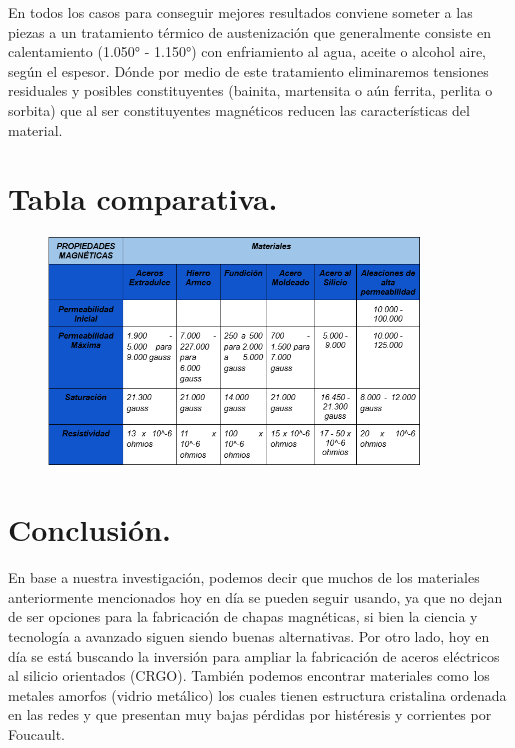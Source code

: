 \documentclass[12pt,a4paper]{article}
\begin{document}
En todos los casos para conseguir mejores resultados conviene someter a las piezas a un tratamiento térmico de austenización que generalmente consiste en calentamiento (1.050° - 1.150°) con enfriamiento al agua, aceite o alcohol aire, según el espesor. Dónde por medio de este tratamiento eliminaremos tensiones residuales y posibles constituyentes (bainita, martensita o aún ferrita, perlita o sorbita) que al ser constituyentes magnéticos reducen las características del material.

\section{Tabla comparativa.}



\begin{figure}[H]    
    \centering         
    \includegraphics[width=0.88\textwidth]{IMAGENES LATEX/11.png}
\end{figure}

\section{Conclusión.}

En base a nuestra investigación, podemos decir que muchos de los materiales anteriormente mencionados hoy en día se pueden seguir usando, ya que no dejan de ser opciones para la fabricación de chapas magnéticas, si bien la ciencia y tecnología a avanzado siguen siendo buenas alternativas. Por otro lado, hoy en día se está buscando la inversión para ampliar la fabricación de aceros eléctricos al silicio orientados (CRGO). También podemos encontrar materiales como los metales amorfos (vidrio metálico) los cuales tienen estructura cristalina ordenada en las redes y que presentan muy bajas pérdidas por histéresis y corrientes por Foucault.
\end{document}
